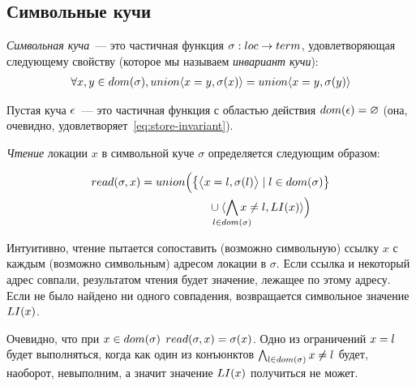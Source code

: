 \subsection{Символьные кучи}

\begin{defn}
\emph{Символьная куча}~--- это частичная функция $\sigma : loc \rightarrow term$, удовлетворяющая следующему свойству (которое мы называем \emph{инвариант кучи}):
\begin{align}\label{eq:store-invariant}
	\forall x, y \in dom(\sigma), union{\langle x=y, \sigma(x)\rangle} = union{\langle x=y, \sigma(y)\rangle}
\end{align}
\end{defn}
%
\begin{defn}\label{def:empty-heap}
Пустая куча $\epsilon$~--- это частичная функция с областью действия $dom(\epsilon)=\varnothing$ (она, очевидно, удовлетворяет~\eqref{eq:store-invariant}).
\end{defn}
%
\begin{defn}\label{def:deref}
\emph{Чтение} локации $x$ в символьной куче $\sigma$ определяется следующим образом:
\begin{figure}[H]
\begin{align}\label{eq:deref-formula}
	\deref{\sigma}{x}&\notag=\rdbody{x}{\sigma}{\li{x}}
\end{align}
\end{figure}
\vspace*{-0.4in}
\end{defn}
%
Интуитивно, чтение пытается сопоставить (возможно символьную) ссылку $x$ с каждым (возможно символьным) адресом локации в $\sigma$. Если ссылка и некоторый адрес совпали, результатом чтения будет значение, лежащее по этому адресу. Если не было найдено ни одного совпадения, возвращается символьное значение $LI(x)$.

Очевидно, что при $x\in dom(\sigma)$ $read(\sigma,x)=\sigma(x)$. Одно из ограничений $x=l$ будет выполняться, когда как один из конъюнктов $\bigwedge_{l\in dom(\sigma)}{x\neq l}$ будет, наоборот, невыполним, а значит значение $LI(x)$ получиться не может.

